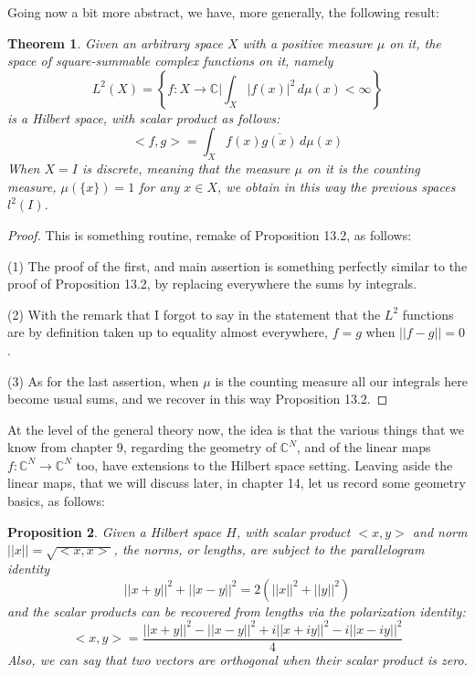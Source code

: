 \documentclass[12pt]{amsbook}
\newtheorem{theorem}{Theorem}[chapter]
\newtheorem{proposition}[theorem]{Proposition}
\begin{document}
Going now a bit more abstract, we have, more generally, the following result:


\begin{theorem}
Given an arbitrary space $X$ with a positive measure $\mu$ on it, the space of square-summable complex functions on it, namely
$$L^2(X)=\left\{f:X\to\mathbb C\Big|\int_X|f(x)|^2\,d\mu(x)<\infty\right\}$$
is a Hilbert space, with scalar product as follows:
$$<f,g>=\int_Xf(x)\overline{g(x)}\,d\mu(x)$$
When $X=I$ is discrete, meaning that the measure $\mu$ on it is the counting measure, $\mu(\{x\})=1$ for any $x\in X$, we obtain in this way the previous spaces $l^2(I)$.
\end{theorem}

\begin{proof}
This is something routine, remake of Proposition 13.2, as follows:

\medskip

(1) The proof of the first, and main assertion is something perfectly similar to the proof of Proposition 13.2, by replacing everywhere the sums by integrals. 

\medskip

(2) With the remark that I forgot to say in the statement that the $L^2$ functions are by definition taken up to equality almost everywhere, $f=g$ when $||f-g||=0$.

\medskip

(3) As for the last assertion, when $\mu$ is the counting measure all our integrals here become usual sums, and we recover in this way Proposition 13.2.
\end{proof}

At the level of the general theory now, the idea is that the various things that we know from chapter 9, regarding the geometry of $\mathbb C^N$, and of the linear maps $f:\mathbb C^N\to\mathbb C^N$ too, have extensions to the Hilbert space setting. Leaving aside the linear maps, that we will discuss later, in chapter 14, let us record some geometry basics, as follows:

\begin{proposition}
Given a Hilbert space $H$, with scalar product $<x,y>$ and norm $||x||=\sqrt{<x,x>}$, the norms, or lengths, are subject to the parallelogram identity
$$||x+y||^2+||x-y||^2=2(||x||^2+||y||^2)$$
and the scalar products can be recovered from lengths via the polarization identity:
$$<x,y>
=\frac{||x+y||^2-||x-y||^2+i||x+iy||^2-i||x-iy||^2}{4}$$
Also, we can say that two vectors are orthogonal when their scalar product is zero.
\end{proposition}
\end{document}

